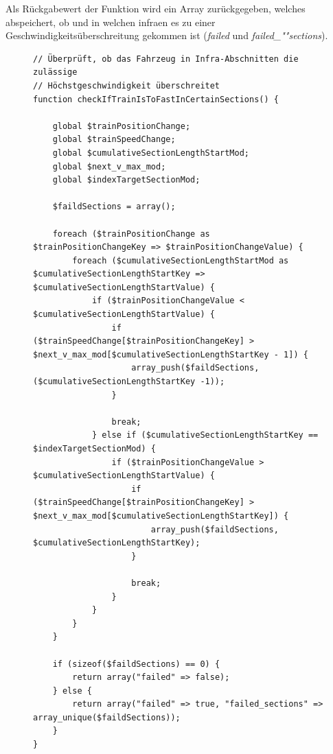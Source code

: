 Als Rückgabewert der Funktion wird ein Array zurückgegeben, welches abspeichert, ob und in welchen \ac{infra}en es zu einer Geschwindigkeitsüberschreitung gekommen ist (\textit{failed} und \textit{failed\_""sec\-tions}).
\begin{figure}
\begin{lstlisting}[caption={\textit{checkIfTrainIsToFastInCertainSections$($$)$} (\textit{func\-tions\_""fahrt\-ver\-lauf\-.php})},captionpos=b,label={lst:checkIfTrainIsToFastInCertainSections}]
// Überprüft, ob das Fahrzeug in Infra-Abschnitten die zulässige
// Höchstgeschwindigkeit überschreitet
function checkIfTrainIsToFastInCertainSections() {

	global $trainPositionChange;
	global $trainSpeedChange;
	global $cumulativeSectionLengthStartMod;
	global $next_v_max_mod;
	global $indexTargetSectionMod;

	$faildSections = array();

	foreach ($trainPositionChange as $trainPositionChangeKey => $trainPositionChangeValue) {
		foreach ($cumulativeSectionLengthStartMod as $cumulativeSectionLengthStartKey => $cumulativeSectionLengthStartValue) {
			if ($trainPositionChangeValue < $cumulativeSectionLengthStartValue) {
				if ($trainSpeedChange[$trainPositionChangeKey] > $next_v_max_mod[$cumulativeSectionLengthStartKey - 1]) {
					array_push($faildSections, ($cumulativeSectionLengthStartKey -1));
				}

				break;
			} else if ($cumulativeSectionLengthStartKey == $indexTargetSectionMod) {
				if ($trainPositionChangeValue > $cumulativeSectionLengthStartValue) {
					if ($trainSpeedChange[$trainPositionChangeKey] > $next_v_max_mod[$cumulativeSectionLengthStartKey]) {
						array_push($faildSections, $cumulativeSectionLengthStartKey);
					}

					break;
				}
			}
		}
	}

	if (sizeof($faildSections) == 0) {
		return array("failed" => false);
	} else {
		return array("failed" => true, "failed_sections" => array_unique($faildSections));
	}
}
\end{lstlisting}
\end{figure}

